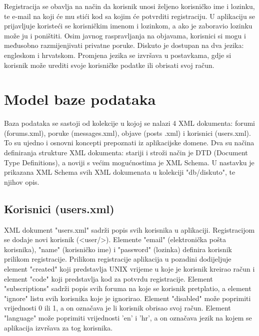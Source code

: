 \documentclass{foi}
\begin{document}
Registracija se obavlja na način da korisnik unosi željeno korisničko ime i lozinku, te e-mail na koji će mu stići kod sa kojim će potvrditi registraciju. U aplikaciju se prijavljuje koristeći se korisničkim imenom i lozinkom, a ako je zaboravio lozinku može ju i poništiti. Osim javnog raspravljanja na objavama, korisnici si mogu i međusobno razmijenjivati privatne poruke. Diskuto je dostupan na dva jezika: engleskom i hrvatskom. Promjena jezika se izvršava u postavkama, gdje si korisnik može urediti svoje korisničke podatke ili obrisati svoj račun.

\chapter{Model baze podataka}

Baza podataka se sastoji od kolekcije u kojoj se nalazi 4 XML dokumenta: forumi (forums.xml), poruke (messages.xml), objave (posts .xml) i korisnici (users.xml). To su ujedno i osnovni koncepti prepoznati iz aplikacijske domene. Dva su načina definiranja strukture XML dokumenta: stariji i stroži način je DTD (Document Type Definitions), a noviji s većim mogućnostima je XML Schema. U nastavku je prikazana XML Schema svih XML dokumenata u kolekciji "db/diskuto", te njihov opis.

\section{Korisnici (users.xml)}

XML dokument "users.xml" sadrži popis svih korisnika u aplikaciji. Registracijom se dodaje novi korisnik (<user/>). Elemente "email" (elektronička pošta korisnika), "name" (korisničko ime) i "password" (lozinka) definira korisnik prilikom registracije. Prilikom registracije aplikacija u pozadini dodijeljuje element "created" koji predstavlja UNIX vrijeme u koje je korisnik kreirao račun i element "code" koji predstavlja kod za potvrdu registracije. Element "subscriptions" sadrži popis svih foruma na koje se korisnik pretplatio, a element "ignore" listu svih korisnika koje je ignorirao. Element "disabled" može poprimiti vrijednosti 0 ili 1, a on označava je li korisnik obrisao svoj račun. Element "language" može poprimiti vrijednosti 'en' i 'hr', a on označava jezik na kojem se aplikacija izvršava za tog korisnika.
\end{document}

